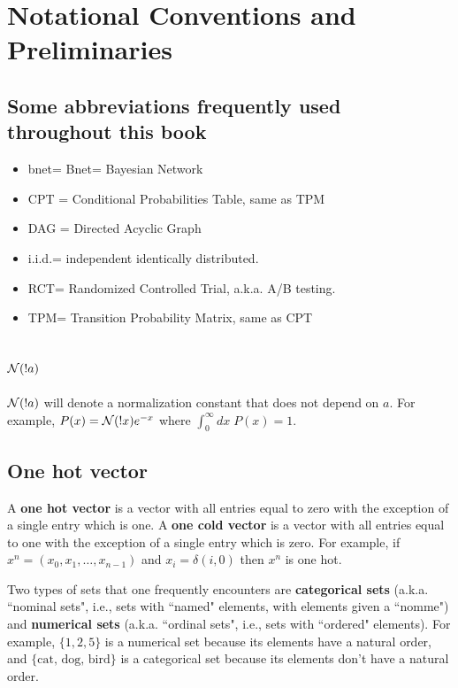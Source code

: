 

\chapter*{Notational Conventions and Preliminaries}

\label{ch0-conventions}
\section{Some abbreviations frequently
used throughout this book}

\begin{itemize}
\item
bnet= Bnet= Bayesian Network
\item
CPT = Conditional Probabilities Table,
 same as TPM
\item
DAG = Directed Acyclic Graph
\item
i.i.d.= independent identically
distributed.
 \item
 RCT= Randomized Controlled Trial,
a.k.a. A/B testing.

\item
TPM= Transition Probability Matrix,
same as CPT

\end{itemize}

\section{${\cal N}(!a)$}
${\cal N}(!a)$ will denote
a normalization constant that does not depend
on $a$. For example, $P(x)={\cal N}(!x)e^{-x}$
where $\int_0^\infty dx \;P(x)=1$.

\section{One hot vector}
A {\bf one hot  vector}
is a vector with all entries
equal to zero with
the exception of a single entry which is one.
A {\bf one cold vector}  is a vector with all entries
equal to one with the exception of  a
single entry which is zero.
For example, if $x^n=(x_0, x_1, \ldots,
x_{n-1})$ and
$x_i=\delta(i,0)$ then $x^n$ is one hot.

Two types of
sets that one frequently encounters
are {\bf categorical sets} (a.k.a. ``nominal sets", i.e.,
sets with ``named" elements, with elements given a ``nomme")
and {\bf numerical sets} (a.k.a. ``ordinal sets", i.e., sets
 with ``ordered"
elements).
For example, $\{1,2,5\}$ is a numerical set
because its elements have a natural order,
and $\{\text{cat, dog, bird}\}$ is a  categorical set
because its elements don't have a natural order.

